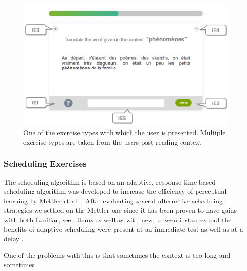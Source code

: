\begin{figure}[h!]
\centering
  \includegraphics[width=\columnwidth]{figures/exercise_translate}
  \caption{One of the exercise types with which the user is presented. Multiple exercise types are taken from the users past reading context}
\end{figure}



\subsubsection{Scheduling Exercises}

The scheduling algorithm is based on an adaptive, response-time-based scheduling algorithm was developed to increase the efficiency of perceptual learning by Mettler et al. \cite{Mettler14-ARTS}. After evaluating several alternative scheduling strategies we settled on the Mettler one since it has been proven to have gains with both familiar, seen items as well as with new, unseen instances and the benefits of adaptive scheduling were present at an immediate test as well as at a delay \cite{Mettler14-ARTS}.



One of the problems with this is that sometimes the context is too long and sometimes 

